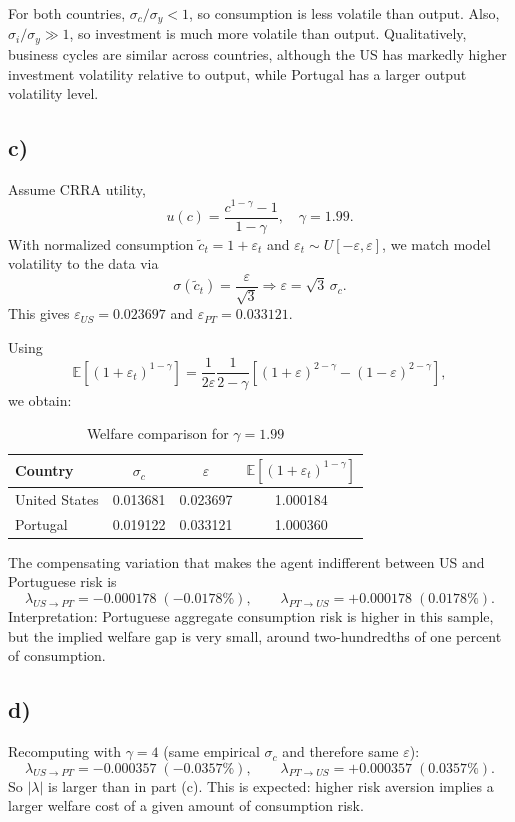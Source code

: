 \documentclass[12pt]{article}
\begin{document}
For both countries, $\sigma_c/\sigma_y<1$, so consumption is less volatile than output. Also, $\sigma_i/\sigma_y\gg 1$, so investment is much more volatile than output. Qualitatively, business cycles are similar across countries, although the US has markedly higher investment volatility relative to output, while Portugal has a larger output volatility level.

\subsection{c)}

Assume CRRA utility,
$$
u(c)=\frac{c^{1-\gamma}-1}{1-\gamma}, \quad \gamma=1.99.
$$
With normalized consumption $\tilde c_t=1+\varepsilon_t$ and $\varepsilon_t\sim U[-\varepsilon,\varepsilon]$, we match model volatility to the data via
$$
\sigma(\tilde c_t)=\frac{\varepsilon}{\sqrt{3}} \Rightarrow \varepsilon=\sqrt{3}\,\sigma_c.
$$
This gives $\varepsilon_{US}=0.023697$ and $\varepsilon_{PT}=0.033121$.

Using
$$
\mathbb{E}\left[(1+\varepsilon_t)^{1-\gamma}\right]
=\frac{1}{2\varepsilon}\frac{1}{2-\gamma}\left[(1+\varepsilon)^{2-\gamma}-(1-\varepsilon)^{2-\gamma}\right],
$$
we obtain:
\begin{table}[H]
\centering
\caption{Welfare comparison for $\gamma=1.99$}
\label{tab:ex1c}
\begin{tabular}{lccc}
\toprule
Country & $\sigma_c$ & $\varepsilon$ & $\mathbb{E}[(1+\varepsilon_t)^{1-\gamma}]$ \\
\midrule
United States & 0.013681 & 0.023697 & 1.000184 \\
Portugal      & 0.019122 & 0.033121 & 1.000360 \\
\bottomrule
\end{tabular}
\end{table}

The compensating variation that makes the agent indifferent between US and Portuguese risk is
$$
\lambda_{US\to PT}=-0.000178 \;(-0.0178\%), \qquad
\lambda_{PT\to US}=+0.000178 \;(0.0178\%).
$$
Interpretation: Portuguese aggregate consumption risk is higher in this sample, but the implied welfare gap is very small, around two-hundredths of one percent of consumption.

\subsection{d)}

Recomputing with $\gamma=4$ (same empirical $\sigma_c$ and therefore same $\varepsilon$):
$$
\lambda_{US\to PT}=-0.000357 \;(-0.0357\%), \qquad
\lambda_{PT\to US}=+0.000357 \;(0.0357\%).
$$
So $|\lambda|$ is larger than in part (c). This is expected: higher risk aversion implies a larger welfare cost of a given amount of consumption risk.
\end{document}
